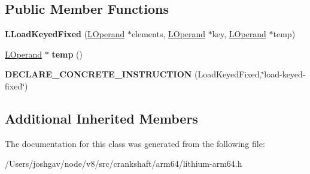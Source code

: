 \subsection*{Public Member Functions}
\begin{DoxyCompactItemize}
\item 
{\bfseries L\+Load\+Keyed\+Fixed} (\hyperlink{classv8_1_1internal_1_1_l_operand}{L\+Operand} $\ast$elements, \hyperlink{classv8_1_1internal_1_1_l_operand}{L\+Operand} $\ast$key, \hyperlink{classv8_1_1internal_1_1_l_operand}{L\+Operand} $\ast$temp)\hypertarget{classv8_1_1internal_1_1_l_load_keyed_fixed_a5e42646d58101f6c2a32e523ca43d7e7}{}\label{classv8_1_1internal_1_1_l_load_keyed_fixed_a5e42646d58101f6c2a32e523ca43d7e7}

\item 
\hyperlink{classv8_1_1internal_1_1_l_operand}{L\+Operand} $\ast$ {\bfseries temp} ()\hypertarget{classv8_1_1internal_1_1_l_load_keyed_fixed_a859e70aaea81fad0a2d86feee7d4d2a5}{}\label{classv8_1_1internal_1_1_l_load_keyed_fixed_a859e70aaea81fad0a2d86feee7d4d2a5}

\item 
{\bfseries D\+E\+C\+L\+A\+R\+E\+\_\+\+C\+O\+N\+C\+R\+E\+T\+E\+\_\+\+I\+N\+S\+T\+R\+U\+C\+T\+I\+ON} (Load\+Keyed\+Fixed,\char`\"{}load-\/keyed-\/fixed\char`\"{})\hypertarget{classv8_1_1internal_1_1_l_load_keyed_fixed_af9deb0ae08e29a99d2c543860bb26eea}{}\label{classv8_1_1internal_1_1_l_load_keyed_fixed_af9deb0ae08e29a99d2c543860bb26eea}

\end{DoxyCompactItemize}
\subsection*{Additional Inherited Members}


The documentation for this class was generated from the following file\+:\begin{DoxyCompactItemize}
\item 
/\+Users/joshgav/node/v8/src/crankshaft/arm64/lithium-\/arm64.\+h\end{DoxyCompactItemize}
